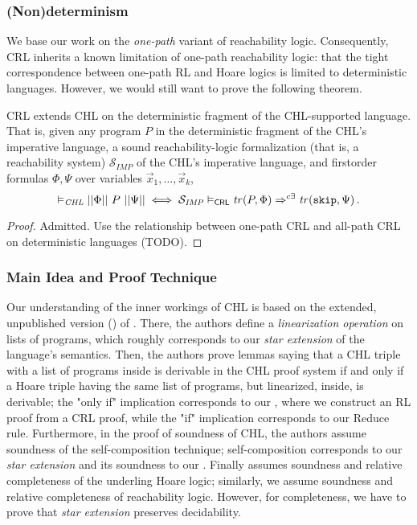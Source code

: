\subsubsection{(Non)determinism}
We base our work on the \emph{one-path} variant of reachability logic.
Consequently, CRL inherits a known limitation of one-path reachability logic: that the tight correspondence between
one-path RL and Hoare logics is limited to deterministic languages.
However, we would still want to prove the following theorem.
\begin{theorem}
CRL extends CHL on the deterministic fragment of the CHL-supported language.
That is, given any program $P$ in the deterministic fragment of the CHL's imperative language,
a sound reachability-logic formalization (that is, a reachability system) $\mathcal{S}_{\mathit{IMP}}$ of the CHL's imperative language,
and firstorder formulas $\Phi, \Psi$ over variables $\vec{x}_1,\ldots,\vec{x}_k$,
\begin{equation*}
    \vDash_{\mathit{CHL}} ||\Phi||\ P\ ||\Psi||
    \iff
    \mathcal{S}_{\mathit{IMP}} \vDash_{\mathsf{CRL}} \mathit{tr}(P, \Phi) \Rightarrow^{c\exists} \mathit{tr}(\texttt{skip}, \Psi) \, .
\end{equation*}
\end{theorem}
\begin{proof}
Admitted. Use the relationship between one-path CRL and all-path CRL on deterministic languages (TODO).
\end{proof}

\subsubsection{Main Idea and Proof Technique}

Our understanding of the inner workings of CHL is based on the extended, unpublished version (\cite{SousaD16Extended})
of \cite{SousaD16}.
There, the authors define a \emph{linearization operation} on lists of programs, which roughly corresponds to our
\emph{star extension} of the language's semantics.
Then, the authors prove lemmas saying that a CHL triple with a list of programs inside is derivable
in the CHL proof system
if and only if 
a Hoare triple having the same list of programs, but linearized, inside, is derivable;
the "only if" implication corresponds to our , where we construct
an RL proof from a CRL proof,
while the "if" implication corresponds to our Reduce rule.
Furthermore, in the proof of soundness of CHL, the authors assume soundness of the self-composition technique;
self-composition corresponds to our \emph{star extension} and its soundness to our .
Finally \cite{SousaD16Extended} assumes soundness and relative completeness of the underling Hoare logic;
similarly, we assume soundness and relative completeness of reachability logic.
However, for completeness, we have to prove that \emph{star extension} preserves decidability.

